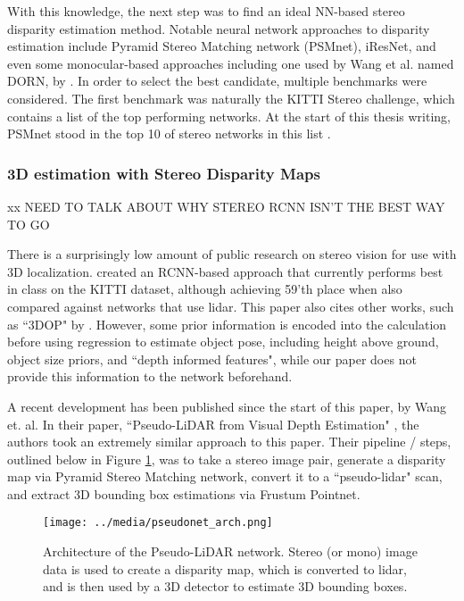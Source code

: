With this knowledge, the next step was to find an ideal NN-based stereo disparity estimation method. Notable neural network approaches to disparity estimation include Pyramid Stereo Matching network (PSMnet),  iResNet, and even some monocular-based approaches including one used by Wang et al. named DORN, by  \cite{fu_deep_2018}. In order to select the best candidate, multiple benchmarks were considered. The first benchmark was naturally the KITTI Stereo challenge, which contains a list of the top performing networks. At the start of this thesis writing, PSMnet stood in the top 10 of stereo networks in this list \cite{menze_kitti_2019}.

\subsubsection{3D estimation with Stereo Disparity Maps}

xx NEED TO TALK ABOUT WHY STEREO RCNN ISN'T THE BEST WAY TO GO

There is a surprisingly low amount of public research on stereo vision for use with 3D localization. \cite{li_stereo_2019} created an RCNN-based approach that currently performs best in class on the KITTI dataset, although achieving 59'th place when also compared against networks that use lidar. This paper also cites other works, such as ``3DOP" by \cite{chen_3d_2016}. However, some prior information is encoded into the calculation before using regression to estimate object pose, including height above ground, object size priors, and ``depth informed features", while our paper does not provide this information to the network beforehand.

A recent development has been published since the start of this paper, by Wang et. al. In their paper, ``Pseudo-LiDAR from Visual Depth Estimation" \cite{wang_pseudo-lidar_2019}, the authors took an extremely similar approach to this paper. Their pipeline / steps, outlined below in Figure \ref{pseudonet_arch}, was to take a stereo image pair, generate a disparity map via Pyramid Stereo Matching network, convert it to a ``pseudo-lidar" scan, and extract 3D bounding box estimations via Frustum Pointnet. \\

\begin{figure}[ht]
    \texttt{[image: ../media/pseudonet\_arch.png]}
    \caption{Architecture of the Pseudo-LiDAR network. Stereo (or mono) image data is used to create a disparity map, which is converted to lidar, and is then used by a 3D detector to estimate 3D bounding boxes.}
    \label{pseudonet_arch}
\end{figure}

